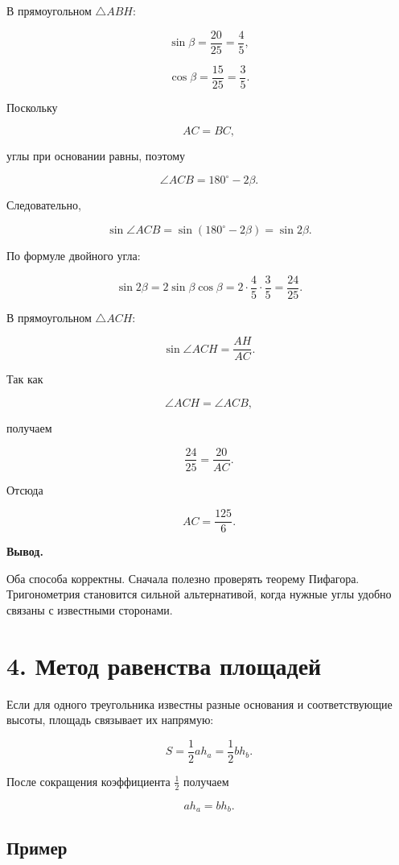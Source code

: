 \documentclass[a4paper,12pt]{article}
\newcommand{\important}[1]{%
  \textbf{\color{darkaccent}#1}%
}
\begin{document}
В прямоугольном $\triangle ABH$:

\[
\sin\beta
=
\frac{20}{25}
=
\frac45,
\]

\[
\cos\beta
=
\frac{15}{25}
=
\frac35.
\]

Поскольку

\[
AC=BC,
\]

углы при основании равны, поэтому

\[
\angle ACB
=
180^\circ-2\beta.
\]

Следовательно,

\[
\sin\angle ACB
=
\sin(180^\circ-2\beta)
=
\sin2\beta.
\]

По формуле двойного угла:

\[
\sin2\beta
=
2\sin\beta\cos\beta
=
2\cdot\frac45\cdot\frac35
=
\frac{24}{25}.
\]

В прямоугольном $\triangle ACH$:

\[
\sin\angle ACH
=
\frac{AH}{AC}.
\]

Так как

\[
\angle ACH=\angle ACB,
\]

получаем

\[
\frac{24}{25}
=
\frac{20}{AC}.
\]

Отсюда

\[
\boxed{AC=\frac{125}{6}}.
\]

\important{Вывод.}
Оба способа корректны.
Сначала полезно проверять теорему Пифагора.
Тригонометрия становится сильной альтернативой,
когда нужные углы удобно связаны с известными сторонами.


\clearpage
\section{4. Метод равенства площадей}

Если для одного треугольника известны разные основания
и соответствующие высоты, площадь связывает их напрямую:

\[
S
=
\frac12 a h_a
=
\frac12 b h_b.
\]

После сокращения коэффициента $\frac12$ получаем

\[
\boxed{a h_a=b h_b}.
\]

\subsection{Пример}
\end{document}
